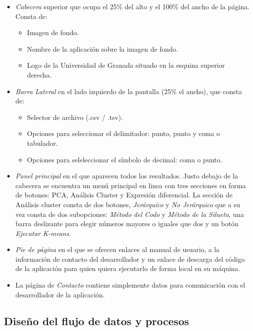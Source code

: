 \begin{itemize}
    \item \textit{Cabecera} superior que ocupa el 25\% del alto y el 100\% del ancho de la página. Consta de:
    \begin{itemize}
        \item Imagen de fondo.
        \item Nombre de la aplicación sobre la imagen de fondo.
        \item Logo de la Universidad de Granada situado en la esquina superior derecha.
    \end{itemize}
    \item  \textit{Barra Lateral} en el lado izquierdo de la pantalla (25\% el ancho), que consta de:
    \begin{itemize}
        \item Selector de archivo (.csv / .tsv).
        \item Opciones para seleccionar el delimitador: punto, punto y coma o tabulador.
        \item Opciones para seleleccionar el símbolo de decimal: coma o punto.
    \end{itemize}
    \item \textit{Panel principal} en el que aparecen todos los resultados. Justo debajo de la cabecera se encuentra un menú
    principal en linea con tres secciones en forma de botones: PCA, Análisis Cluster y Expresión diferencial. La sección de Análisis cluster
    consta de dos botones, \textit{Jerárquico} y \textit{No Jerárquico} que a su vez consta de dos subopciones: \textit{Método del Codo} y \textit{Método
    de la Silueta}, una barra deslizante para elegir números mayores o iguales que dos y un botón \textit{Ejecutar K-means}.
    \item \textit{Pie de página} en el que se ofrecen enlaces al manual de usuario, a la información de contacto del desarrollador y un enlace de
    descarga del código de la aplicación para quien quiera ejecutarlo de forma local en su máquina.
    \item La página de \textit{Contacto} contiene simplemente datos para comunicación con el desarrollador de la aplicación.
\end{itemize}

\subsection{Diseño del flujo de datos y procesos}

